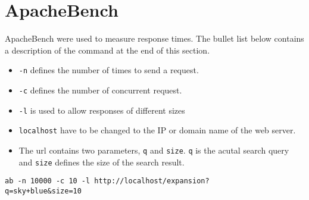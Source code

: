 \section{ApacheBench}
\label{ap:apache-benchmark}

ApacheBench \cite{apache-benchmark} were used to measure response times.
The bullet list below contains a description of the command at the end of this section.

\begin{itemize}
  \item \texttt{-n} defines the number of times to send a request.
  \item \texttt{-c} defines the number of concurrent request.
  \item \texttt{-l} is used to allow responses of different sizes
  \item \texttt{localhost} have to be changed to the IP or domain name of the web server.
  \item The url contains two parameters, \texttt{q} and \texttt{size}.
  \texttt{q} is the acutal search query and \texttt{size} defines the size of the search result.
\end{itemize}

\texttt{ab -n 10000 -c 10 -l http://localhost/expansion?}\\
\texttt{q=sky+blue\&size=10}
